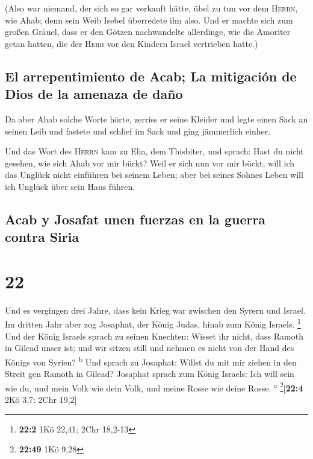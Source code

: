  (Also war niemand, der sich so gar verkauft hätte, übel
zu tun vor dem \textsc{Herrn}, wie Ahab; denn sein Weib Isebel
überredete ihn also.  Und er machte sich zum großen
Gräuel, dass er den Götzen nachwandelte allerdinge, wie die Amoriter
getan hatten, die der \textsc{Herr} vor den Kindern Israel vertrieben
hatte.)

\hypertarget{el-arrepentimiento-de-acab-la-mitigaciuxf3n-de-dios-de-la-amenaza-de-dauxf1o}{%
\subsection{El arrepentimiento de Acab; La mitigación de Dios de la
amenaza de
daño}\label{el-arrepentimiento-de-acab-la-mitigaciuxf3n-de-dios-de-la-amenaza-de-dauxf1o}}

 Da aber Ahab solche Worte hörte, zerriss er seine
Kleider und legte einen Sack an seinen Leib und fastete und schlief im
Sack und ging jämmerlich einher.

 Und das Wort des \textsc{Herrn} kam zu Elia, dem
Thisbiter, und sprach:  Hast du nicht gesehen, wie sich
Ahab vor mir bückt? Weil er sich nun vor mir bückt, will ich das Unglück
nicht einführen bei seinem Leben; aber bei seines Sohnes Leben will ich
Unglück über sein Haus führen.

\hypertarget{acab-y-josafat-unen-fuerzas-en-la-guerra-contra-siria}{%
\subsection{Acab y Josafat unen fuerzas en la guerra contra
Siria}\label{acab-y-josafat-unen-fuerzas-en-la-guerra-contra-siria}}

\hypertarget{section-21}{%
\section{22}\label{section-21}}

 Und es vergingen drei Jahre, dass kein Krieg war zwischen
den Syrern und Israel.  Im dritten Jahr aber zog Josaphat,
der König Judas, hinab zum König Israels. \footnote{\textbf{22:2} 1Kö
  22,41; 2Chr 18,2-13}  Und der König Israels sprach zu
seinen Knechten: Wisset ihr nicht, dass Ramoth in Gilead unser ist; und
wir sitzen still und nehmen es nicht von der Hand des Königs von Syrien?
\textsuperscript{b}  Und sprach zu Josaphat: Willst du mit
mir ziehen in den Streit gen Ramoth in Gilead? Josaphat sprach zum König
Israels: Ich will sein wie du, und mein Volk wie dein Volk, und meine
Rosse wie deine Rosse. \textsuperscript{c} \footnote{\textbf{22:49} 1Kö
  9,28}{[}\textbf{22:4} 2Kö 3,7; 2Chr 19,2{]}

